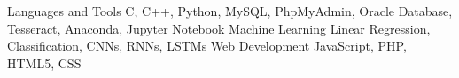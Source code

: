 \begin{cvskills}
  \cvskill
    {Languages and Tools} %
    {C, C++, Python, MySQL,  PhpMyAdmin, Oracle Database, Tesseract, Anaconda, Jupyter Notebook} %
  \cvskill
    {Machine Learning} %
    {Linear Regression, Classification, CNNs, RNNs, LSTMs} %
  \cvskill
    {Web Development} %
    {JavaScript, PHP, HTML5, CSS} %
\end{cvskills}
